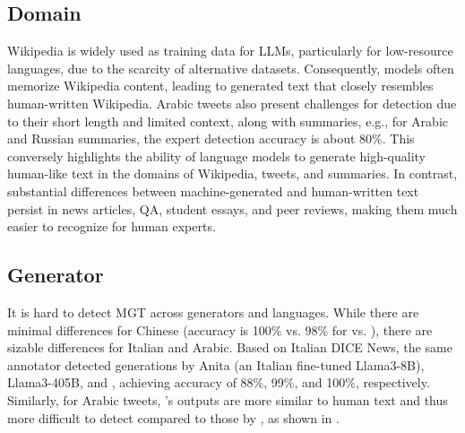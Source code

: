 \subsection{Domain}
Wikipedia is widely used as training data for LLMs, particularly for low-resource languages, due to the scarcity of alternative datasets. Consequently, models often memorize Wikipedia content, leading to generated text that closely resembles human-written Wikipedia. 
Arabic tweets also present challenges for detection due to their short length and limited context, along with summaries, e.g., for Arabic and Russian summaries, the expert detection accuracy is about 80\%. 
This conversely highlights the ability of language models to generate high-quality human-like text in the domains of Wikipedia, tweets, and summaries. In contrast, substantial differences between machine-generated and human-written text persist in news articles, QA, student essays, and peer reviews, making them much easier to recognize for human experts. 



\subsection{Generator} 

It is hard to detect MGT across generators and languages.
While there are minimal differences for Chinese (accuracy is 100\% vs. 98\% for \gptfouro vs. \qwenturbo), there are sizable differences for Italian and Arabic.
Based on Italian DICE News, the same annotator detected generations by Anita (an Italian fine-tuned Llama3-8B), Llama3-405B, and \gptfouro, achieving accuracy of 88\%, 99\%, and 100\%, respectively.
Similarly, for Arabic tweets, \gptfouro's outputs are more similar to human text and thus more difficult to detect compared to those by \qwentwo, as shown in .

